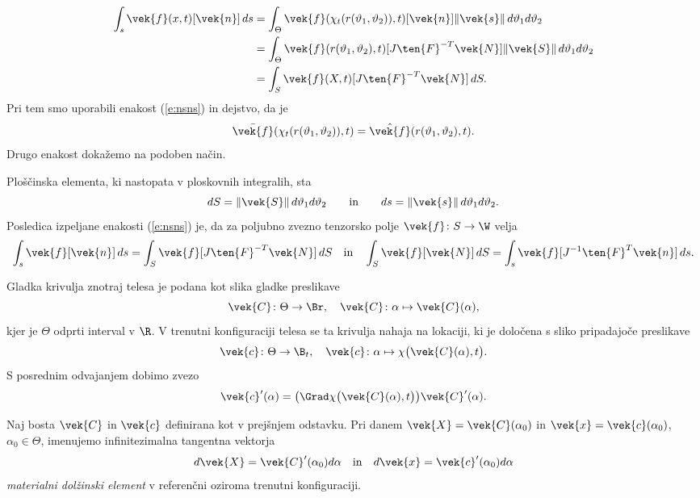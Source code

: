 \proof
	\begin{align*}
		\int_s\vek{f}(x,t)[\vek{n}]\,ds&=
		\int_{\Theta}\vek{f}(\chi_t(r(\vartheta_1,\vartheta_2)),t)
		[\vek{n}]\|\vek{s}\|\,d\vartheta_1d\vartheta_2\\
		&=\int_{\Theta}\vek{f}(r(\vartheta_1,\vartheta_2),t)
		[J\ten{F}^{-T}\vek{N}]\|\vek{S}\|\,d\vartheta_1d\vartheta_2\\
		&=\int_S\vek{f}(X,t)[J\ten{F}^{-T}\vek{N}]\,dS.
	\end{align*}
	Pri tem smo uporabili enakost (\ref{e:nsns}) in dejstvo, da je
	\[ \bar{\vek{f}}(\chi_t(r(\vartheta_1,\vartheta_2)),t)=\hat{\vek{f}}(r(\vartheta_1,\vartheta_2),t). \]
	Drugo enakost dokažemo na podoben način.
\endproof

Ploščinska elementa, ki nastopata v ploskovnih integralih, sta
\[
	dS=\|\vek{S}\|\,d\vartheta_1d\vartheta_2\qquad\textrm{in}\qquad
	ds=\|\vek{s}\|\,d\vartheta_1d\vartheta_2.
\]
Posledica izpeljane enakosti (\ref{e:nsns}) je, da za poljubno zvezno tenzorsko polje
$\vek{f}\colon S\to\W$ velja
\[
	\int_s\vek{f}[\vek{n}]\,ds=\int_S\vek{f}[J\ten{F}^{-T}\vek{N}]\,dS\quad\textrm{in}\quad
	\int_S\vek{f}[\vek{N}]\,dS=\int_s\vek{f}[J^{-1}\ten{F}^{T}\vek{n}]\,ds.
\]

Gladka krivulja znotraj telesa je podana kot slika gladke preslikave
\[\vek{C}\colon \Theta\to\Br, \quad \vek{C}\colon\alpha\mapsto\vek{C}(\alpha),\]
kjer je $\Theta$ odprti interval v $\R$.
V trenutni konfiguraciji telesa se ta krivulja nahaja na lokaciji, ki je določena s sliko pripadajoče preslikave
\[ \vek{c}\colon \Theta\to\B_t,\quad \vek{c}\colon\alpha\mapsto\chi\big(\vek{C}(\alpha),t\big). \]
S posrednim odvajanjem dobimo zvezo
\begin{equation} \label{e:3101}
	\vek{c}'(\alpha) = \big( \Grad\chi\big(\vek{C}(\alpha),t\big)\big)\vek{C}'(\alpha).
\end{equation}
\begin{definicija}
	Naj bosta $\vek{C}$ in $\vek{c}$ definirana kot v prejšnjem odstavku.
	Pri danem $\vek{X}=\vek{C}(\alpha_0)$ in $\vek{x}=\vek{c}(\alpha_0)$, $\alpha_0\in\Theta$, imenujemo
	infinitezimalna tangentna vektorja
	\[ d\vek{X}=\vek{C}'(\alpha_0)d\alpha \quad \mathrm{in} \quad d\vek{x}=\vek{c}'(\alpha_0)d\alpha \]
	\emph{materialni dolžinski element} v referenčni oziroma trenutni konfiguraciji.
\end{definicija}

